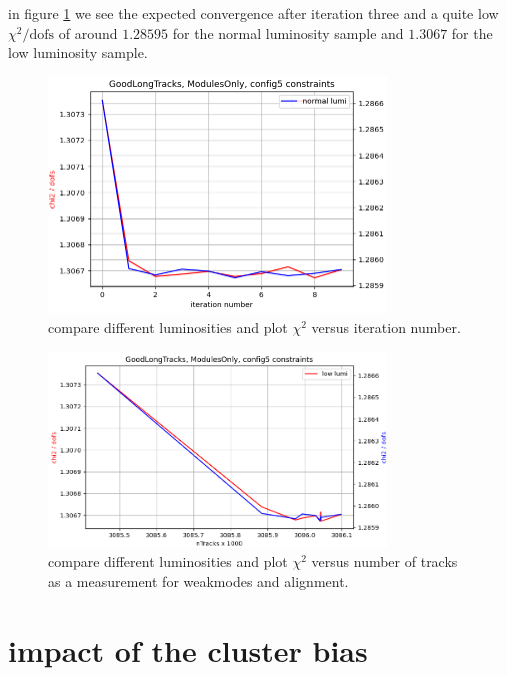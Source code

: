 in figure \ref{fig:chi2iter_lumi_normal} we see the expected convergence after iteration three and a quite low $\chi^2 / \text{dofs}$ of around $\num{1.28595}$ for the normal luminosity sample and $\num{1.3067}$ for the low luminosity sample.

\begin{figure}
  \centering
  \includegraphics[width=0.8\textwidth]{plots/renewed_plots/modules_chi2_c5.png}
  \caption{compare different luminosities and plot $\chi^2$ versus iteration number.}
  \label{fig:chi2iter_lumi_normal}
\end{figure}

\begin{figure}
  \centering
  \includegraphics[width=0.8\textwidth]{plots/jan_17_2022/chi2_tracks_modulesOnly.png}
  \caption{compare different luminosities and plot $\chi^2$ versus number of tracks as a measurement for weakmodes and alignment.}
  \label{fig:chi2tracks_lumi_normal}
\end{figure}

\section{impact of the cluster bias}

